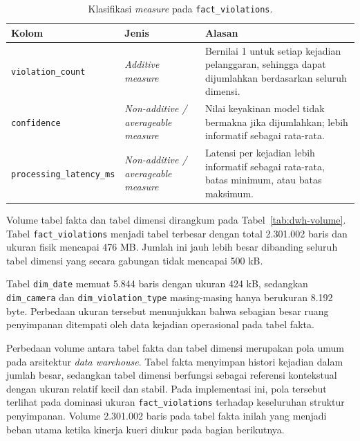 \begin{table}[htbp]
\centering
\caption{Klasifikasi \textit{measure} pada \texttt{fact\_violations}.}
\label{tab:klasifikasi-measure-dw}
\footnotesize
\setlength{\tabcolsep}{4pt}
\renewcommand{\arraystretch}{1.18}
\begin{tabularx}{\textwidth}{>{\RaggedRight\arraybackslash}p{3.1cm} >{\RaggedRight\arraybackslash}p{3.0cm} >{\RaggedRight\arraybackslash}X}
\toprule
\textbf{Kolom} & \textbf{Jenis} & \textbf{Alasan} \\
\midrule
\texttt{violation\_count} & \textit{Additive measure} & Bernilai 1 untuk setiap kejadian pelanggaran, sehingga dapat dijumlahkan berdasarkan seluruh dimensi. \\
\texttt{confidence} & \textit{Non-additive / averageable measure} & Nilai keyakinan model tidak bermakna jika dijumlahkan; lebih informatif sebagai rata-rata. \\
\texttt{processing\_latency\_ms} & \textit{Non-additive / averageable measure} & Latensi per kejadian lebih informatif sebagai rata-rata, batas minimum, atau batas maksimum. \\
\bottomrule
\end{tabularx}
\renewcommand{\arraystretch}{1.0}
\end{table}

Volume tabel fakta dan tabel dimensi dirangkum pada Tabel~\ref{tab:dwh-volume}. Tabel \texttt{fact\_violations} menjadi tabel terbesar dengan total 2.301.002 baris dan ukuran fisik mencapai 476 MB. Jumlah ini jauh lebih besar dibanding seluruh tabel dimensi yang secara gabungan tidak mencapai 500 kB.

Tabel \texttt{dim\_date} memuat 5.844 baris dengan ukuran 424 kB, sedangkan \texttt{dim\_camera} dan \texttt{dim\_violation\_type} masing-masing hanya berukuran 8.192 byte. Perbedaan ukuran tersebut menunjukkan bahwa sebagian besar ruang penyimpanan ditempati oleh data kejadian operasional pada tabel fakta.

Perbedaan volume antara tabel fakta dan tabel dimensi merupakan pola umum pada arsitektur \textit{data warehouse}. Tabel fakta menyimpan histori kejadian dalam jumlah besar, sedangkan tabel dimensi berfungsi sebagai referensi kontekstual dengan ukuran relatif kecil dan stabil. Pada implementasi ini, pola tersebut terlihat pada dominasi ukuran \texttt{fact\_violations} terhadap keseluruhan struktur penyimpanan. Volume 2.301.002 baris pada tabel fakta inilah yang menjadi beban utama ketika kinerja kueri diukur pada bagian berikutnya.

